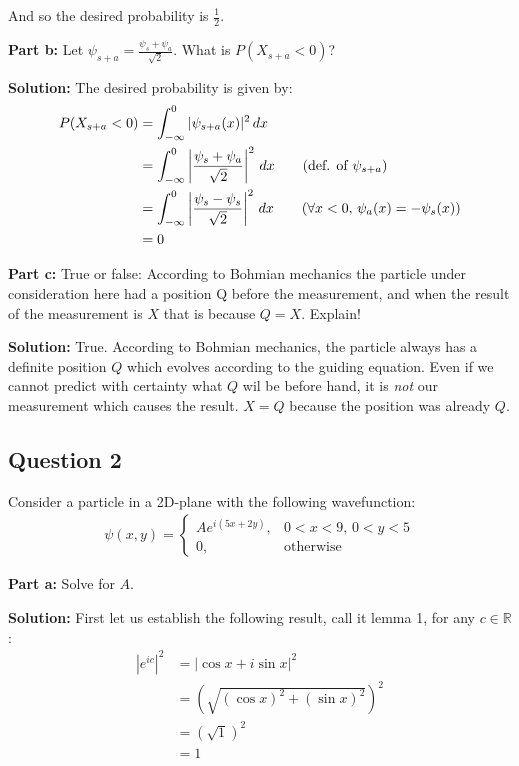 \documentclass{article}
\begin{document}
And so the desired probability is $\frac{1}{2}$.
\bigskip

\noindent\textbf{Part b:} Let $\psi_{s+a}=\frac{\psi_s+\psi_a}{\sqrt{2}}$. What is $P(X_{s+a}<0)$?
\bigskip

\noindent\textbf{Solution:} The desired probability is given by:
\begin{align*}
    P(X_{s+a}<0)&=\int_{-\infty}^0|\psi_{s+a}(x)|^2\,dx\\
    &=\int_{-\infty}^0\left|\frac{\psi_s+\psi_a}{\sqrt{2}}\right|^2\,dx\tag{def. of $\psi_{s+a}$}\\
    &=\int_{-\infty}^0\left|\frac{\psi_s-\psi_s}{\sqrt{2}}\right|^2\,dx\tag{$\forall x<0,\, \psi_a(x)=-\psi_s(x)$}\\
    &=0
\end{align*}
\bigskip

\noindent\textbf{Part c:} True or false: According to Bohmian mechanics the particle under consideration here had a position Q before the measurement, and when the result of the measurement is $X$ that is because $Q=X$. Explain!
\bigskip

\noindent\textbf{Solution:} True. According to Bohmian mechanics, the particle always has a definite position $Q$ which evolves according to the guiding equation. Even if we cannot predict with certainty what $Q$ wil be before hand, it is \textit{not} our measurement which causes the result. $X=Q$ because the position was already $Q$.
\bigskip

\subsection*{Question 2}
Consider a particle in a 2D-plane with the following wavefunction:
\begin{align*}
    \psi(x,y)=\begin{cases}
        Ae^{i(5x+2y)},&0<x<9,\,0<y<5\\
        0,&\text{otherwise}
    \end{cases}
\end{align*}
\bigskip

\noindent\textbf{Part a:} Solve for $A$.
\bigskip

\noindent\textbf{Solution:} First let us establish the following result, call it lemma 1, for any $c\in\mathbb R$:
\begin{align*}
    |e^{ic}|^2&=|\cos x+i\sin x|^2\tag{Euler's formula}\\
    &=\left(\sqrt{(\cos x)^2+(\sin x)^2}\right)^2\tag{def. of modulus}\\
    &=\left(\sqrt{1}\right)^2\tag{trig identity}\\
    &=1
\end{align*}
\end{document}

